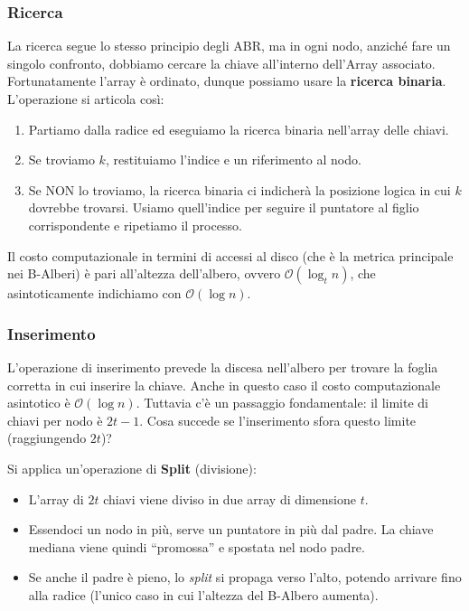 \documentclass[12pt]{report}
\begin{document}
	\subsubsection*{Ricerca}
	La ricerca segue lo stesso principio degli ABR, ma in ogni nodo, anziché fare un singolo confronto, dobbiamo cercare la chiave all'interno dell'Array associato. Fortunatamente l'array è ordinato, dunque possiamo usare la \textbf{ricerca binaria}.
	L'operazione si articola così:
	\begin{enumerate}
		\item Partiamo dalla radice ed eseguiamo la ricerca binaria nell'array delle chiavi.
		\item Se troviamo $k$, restituiamo l'indice e un riferimento al nodo.
		\item Se NON lo troviamo, la ricerca binaria ci indicherà la posizione logica in cui $k$ dovrebbe trovarsi. Usiamo quell'indice per seguire il puntatore al figlio corrispondente e ripetiamo il processo.
	\end{enumerate}
	Il costo computazionale in termini di accessi al disco (che è la metrica principale nei B-Alberi) è pari all'altezza dell'albero, ovvero $\mathcal{O}(\log_t n)$, che asintoticamente indichiamo con $\mathcal{O}(\log n)$.
	
	\subsubsection*{Inserimento}
	L'operazione di inserimento prevede la discesa nell'albero per trovare la foglia corretta in cui inserire la chiave. Anche in questo caso il costo computazionale asintotico è $\mathcal{O}(\log n)$. 
	Tuttavia c'è un passaggio fondamentale: il limite di chiavi per nodo è $2t-1$. Cosa succede se l'inserimento sfora questo limite (raggiungendo $2t$)?
	
	Si applica un'operazione di \textbf{Split} (divisione):
	\begin{itemize}
		\item L'array di $2t$ chiavi viene diviso in due array di dimensione $t$.
		\item Essendoci un nodo in più, serve un puntatore in più dal padre. La chiave mediana viene quindi ``promossa'' e spostata nel nodo padre.
		\item Se anche il padre è pieno, lo \textit{split} si propaga verso l'alto, potendo arrivare fino alla radice (l'unico caso in cui l'altezza del B-Albero aumenta).
	\end{itemize}
	
\end{document}
